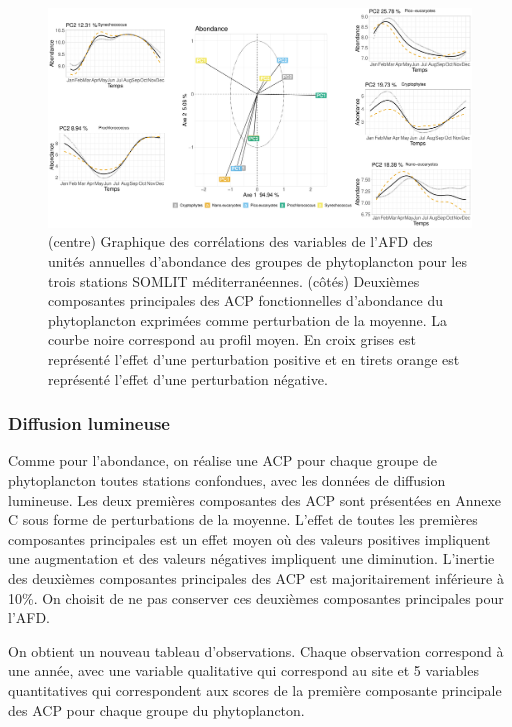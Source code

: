 \documentclass[12pt]{article}
\begin{document}
\begin{figure}
\centering
\hspace*{-35pt}
\includegraphics[width=1.1\textwidth]{fig/R222_fda_fpca_ab.pdf}
\caption{(centre) Graphique des corrélations des variables de l'AFD des unités annuelles d'abondance des groupes de phytoplancton pour les trois stations SOMLIT méditer\-ranéennes. (côtés) Deuxièmes composantes principales des ACP fonctionnelles d'abondance du phytoplancton exprimées comme perturbation de la moyenne. La courbe noire correspond au profil moyen. En croix grises est représenté l’effet d’une perturbation positive et en tirets orange est représenté l’effet d’une perturbation négative.}
\label{afd_ab_var}
\end{figure}

\subsubsection{Diffusion lumineuse}

Comme pour l’abondance, on réalise une ACP pour chaque groupe de phytoplancton toutes stations confondues, avec les données de diffusion lumineuse. Les deux premières composantes des ACP sont présentées en Annexe C sous forme de perturbations de la moyenne. L’effet de toutes les premières composantes principales est un effet moyen où des valeurs positives impliquent une augmentation et des valeurs négatives impliquent une diminution. L’inertie des deuxièmes composantes principales des ACP est majoritairement inférieure à 10\%. On choisit de ne pas conserver ces deuxièmes composantes principales pour l’AFD.

On obtient un nouveau tableau d’observations. Chaque observation correspond à une année, avec une variable qualitative qui correspond au site et 5 variables quantitatives qui correspondent aux scores de la première composante principale des ACP pour chaque groupe du phytoplancton. 
\end{document}

